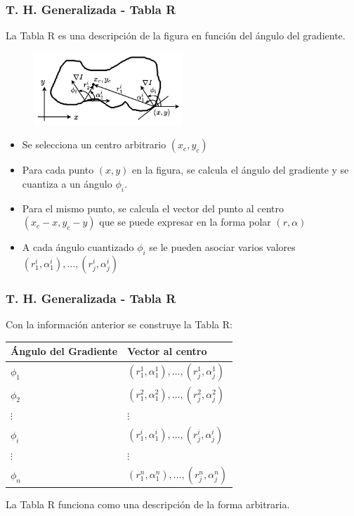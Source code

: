 \begin{frame}\frametitle{T. H. Generalizada - Tabla R}
  La Tabla R es una descripción de la figura en función del ángulo del gradiente.
  \begin{figure}
    \centering
    \includegraphics[width=0.5\textwidth]{Figures/HoughTableR.pdf}
  \end{figure}
  \begin{itemize}
  \item Se selecciona un centro arbitrario $(x_c, y_c)$
  \item Para cada punto $(x,y)$ en la figura, se calcula el ángulo del gradiente y se cuantiza a un ángulo $\phi_i$. 
  \item Para el mismo punto, se calcula el vector del punto al centro $(x_c - x, y_c - y)$ que se puede expresar en la forma polar $(r,\alpha)$
  \item A cada ángulo cuantizado $\phi_i$ se le pueden asociar varios valores $(r_1^i, \alpha_1^i),\dots , (r_j^i, \alpha_j^i)$
  \end{itemize}
\end{frame}

\begin{frame}\frametitle{T. H. Generalizada - Tabla R}
  Con la información anterior se construye la Tabla R:
  \[\]
  \begin{table}
    \centering
  \begin{tabular}{l|l}
    Ángulo del Gradiente & Vector al centro \\
    \hline
    $\phi_1$ & $(r_1^1, \alpha_1^1),\dots , (r_j^1, \alpha_j^1)$\\
    $\phi_2$ & $(r_1^2, \alpha_1^2),\dots , (r_j^2, \alpha_j^2)$\\
    $\vdots$ & $\vdots$\\
    $\phi_i$ & $(r_1^i, \alpha_1^i),\dots , (r_j^i, \alpha_j^i)$\\
    $\vdots$ & $\vdots$\\
    $\phi_n$ & $(r_1^n, \alpha_1^n),\dots , (r_j^n, \alpha_j^n)$
  \end{tabular}
  \end{table}
  \[\]
  La Tabla R funciona como una descripción de la forma arbitraria.
\end{frame}

